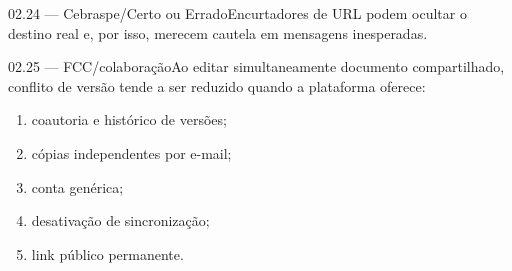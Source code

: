 \begin{questao}{ 02.24 — Cebraspe/Certo ou Errado}Encurtadores de URL podem ocultar o destino real e, por isso, merecem cautela em mensagens inesperadas.\end{questao}
\begin{questao}{ 02.25 — FCC/colaboração}Ao editar simultaneamente documento compartilhado, conflito de versão tende a ser reduzido quando a plataforma oferece:\begin{enumerate}[label=\Alph*)]\item coautoria e histórico de versões;\item cópias independentes por e-mail;\item conta genérica;\item desativação de sincronização;\item link público permanente.\end{enumerate}\end{questao}

